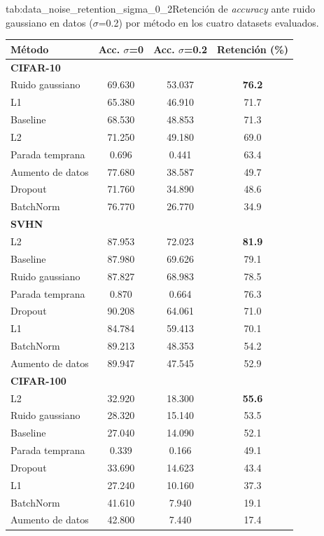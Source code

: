 \begin{table}{tab:data_noise_retention_sigma_0_2}{Retención de \textit{accuracy} ante ruido gaussiano en datos ($\sigma$=0.2) por método en los cuatro datasets evaluados.}
\small
\begin{tabular}{lccc}
\toprule
\textbf{Método} & \textbf{Acc. $\sigma$=0} & \textbf{Acc. $\sigma$=0.2} & \textbf{Retención (\%)} \\
\midrule
\multicolumn{4}{l}{\textbf{CIFAR-10}}\\
\midrule
Ruido gaussiano & 69.630 & 53.037 & \textbf{76.2} \\
L1 & 65.380 & 46.910 & 71.7 \\
Baseline & 68.530 & 48.853 & 71.3 \\
L2 & 71.250 & 49.180 & 69.0 \\
Parada temprana & 0.696 & 0.441 & 63.4 \\
Aumento de datos & 77.680 & 38.587 & 49.7 \\
Dropout & 71.760 & 34.890 & 48.6 \\
BatchNorm & 76.770 & 26.770 & 34.9 \\
\midrule
\multicolumn{4}{l}{\textbf{SVHN}}\\
\midrule
L2 & 87.953 & 72.023 & \textbf{81.9} \\
Baseline & 87.980 & 69.626 & 79.1 \\
Ruido gaussiano & 87.827 & 68.983 & 78.5 \\
Parada temprana & 0.870 & 0.664 & 76.3 \\
Dropout & 90.208 & 64.061 & 71.0 \\
L1 & 84.784 & 59.413 & 70.1 \\
BatchNorm & 89.213 & 48.353 & 54.2 \\
Aumento de datos & 89.947 & 47.545 & 52.9 \\
\midrule
\multicolumn{4}{l}{\textbf{CIFAR-100}}\\
\midrule
L2 & 32.920 & 18.300 & \textbf{55.6} \\
Ruido gaussiano & 28.320 & 15.140 & 53.5 \\
Baseline & 27.040 & 14.090 & 52.1 \\
Parada temprana & 0.339 & 0.166 & 49.1 \\
Dropout & 33.690 & 14.623 & 43.4 \\
L1 & 27.240 & 10.160 & 37.3 \\
BatchNorm & 41.610 & 7.940 & 19.1 \\
Aumento de datos & 42.800 & 7.440 & 17.4 \\

\end{tabular}
\end{table}
